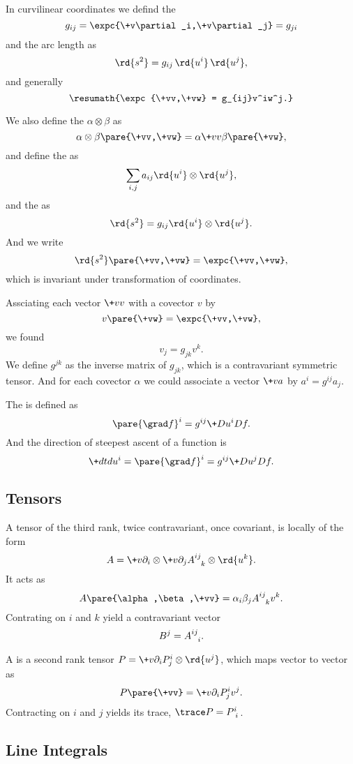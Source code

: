 \documentclass[hidelinks]{article}
\let\oldgloss\gloss
\def\gloss#1{\textbf{\oldgloss{#1}}}
\begin{document}
In curvilinear coordinates we defind the 
\[ g_{ij} = \expc{\+v\partial_i,\+v\partial_j} = g_{ji} \]
and the arc length as
\[ \rd{s^2} = g_{ij}\,\rd{u^i}\,\rd{u^j}, \]
and generally
\[ \resumath{\expc{\+vv,\+vw} = g_{ij}v^iw^j.} \]
\par
We also define the  $\alpha \otimes \beta$ as
\[ \alpha \otimes \beta\pare{\+vv,\+vw} = \alpha{\+vv}\beta\pare{\+vw}, \]
and define the  as
\[ \sum_{i,j} a_{ij}\rd{u^i}\otimes \rd{u^j}, \]
and the  as
\[ \rd{s^2} = g_{ij}\rd{u^i}\otimes \rd{u^j}. \]
And we write
\[ \rd{s^2}\pare{\+vv,\+vw} = \expc{\+vv,\+vw}, \]
which is invariant under transformation of coordinates.
\par
Assciating each vector $\+vv$ with a covector $v$ by
\[ v\pare{\+vw} = \expc{\+vv,\+vw}, \]
we found
\[ v_j = g_{jk}v^k. \]
We define $g^{jk}$ as the inverse matrix of $g_{jk}$, which is a contravariant symmetric tensor. And for each covector $\alpha$ we could associate a vector $\+va$ by $a^i = g^{ij} a_j$.
\par
The  is defined as
\[ \pare{\grad f}^i = g^{ij} \+D{u^i}D{f}. \]
And the direction of steepest ascent of a function is
\[ \+dtd{u^i} = \pare{\grad f}^i = g^{ij}\+D{u^j}Df. \]


\subsection{Tensors} %
\label{sub:tensors}

A tensor of the third rank, twice contravariant, once covariant, is locally of the form
\[ A = \+v\partial_i \otimes \+v\partial_j \tensor{A}{^i^j_k}\otimes \rd{u^k}. \]
It acts as
\[ A\pare{\alpha,\beta,\+vv} = \alpha_i \beta_j \tensor{A}{^i^j_k}v^k. \]
Contrating on $i$ and $k$ yield a contravariant vector
\[ B^j = \tensor{A}{^i^j_i}. \]
\par
A  is a second rank tensor $P = \+v\partial_i P^i_j \otimes \rd{u^j}$, which maps vector to vector as
\[ P\pare{\+vv} = \+v\partial_i P^i_j v^j. \]
Contracting on $i$ and $j$ yields its trace, $\trace P = \tensor{P}{^i_i}$.


\subsection{Line Integrals} %
\label{sub:line_integrals}
\end{document}
